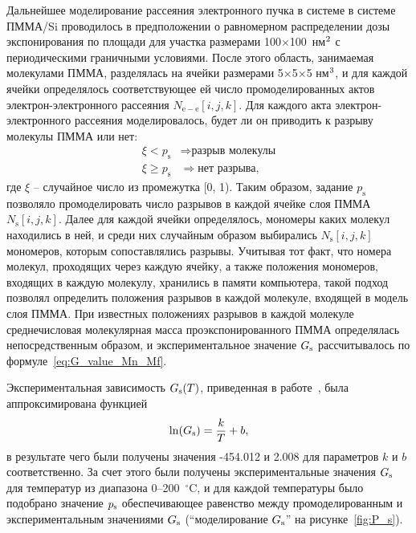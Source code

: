 Дальнейшее моделирование рассеяния электронного пучка в системе в системе ПММА/Si проводилось в предположении о равномерном распределении дозы экспонирования по площади для участка размерами 100$\times$100~нм$^\text{2}$ с периодическими граничными условиями.
После этого область, занимаемая молекулами ПММА, разделялась на ячейки размерами 5$\times$5$\times$5 нм$^\text{3}$, и для каждой ячейки определялось соответствующее ей число промоделированных актов электрон-электронного рассеяния $N_{\mathrm{e-e}}[i, j, k]$.
Для каждого акта электрон-электронного рассеяния моделировалось, будет ли он приводить к разрыву молекулы ПММА или нет:
\begin{equation} \label{eq:MC_9}
	\begin{aligned}
		\xi < p_\mathrm{s} & \Rightarrow \text{разрыв молекулы} \\
		\xi \geq p_\mathrm{s} & \Rightarrow \text{нет разрыва},
	\end{aligned}
\end{equation}
где $\xi$ -- случайное число из промежутка [0, 1).
Таким образом, задание $p_\mathrm{s}$ позволяло промоделировать число разрывов в каждой ячейке слоя ПММА $N_\mathrm{s}[i, j, k]$.
Далее для каждой ячейки определялось, мономеры каких молекул находились в ней, и среди них случайным образом выбирались $N_\mathrm{s}[i, j, k]$ мономеров, которым сопоставлялись разрывы.
Учитывая тот факт, что номера молекул, проходящих через каждую ячейку, а также положения мономеров, входящих в каждую молекулу, хранились в памяти компьютера, такой подход позволял определить положения разрывов в каждой молекуле, входящей в модель слоя ПММА.
При известных положениях разрывов в каждой молекуле среднечисловая молекулярная масса проэкспонированного ПММА определялась непосредственным образом, и экспериментальное значение $G_\mathrm{s}$ рассчитывалось по формуле~\ref{eq:G_value_Mn_Mf}.

Экспериментальная зависимость $G_\mathrm{s}(T)$, приведенная в работе~\cite{Charlesby_1964_Gs}, была аппроксимирована функцией
\begin{equation}
	\ln(G_\mathrm{s}) = \frac{k}{T} + b,
\end{equation}
в результате чего были получены значения -454.012 и 2.008 для параметров $k$ и $b$ соответственно.
За счет этого были получены экспериментальные значения $G_\mathrm{s}$ для температур из диапазона 0--200~$^\circ$C, и для каждой температуры было подобрано значение $p_\mathrm{s}$ обеспечивающее равенство между промоделированным и экспериментальным значениями $G_\mathrm{s}$ (``моделирование $G_\mathrm{s}$'' на рисунке~\ref{fig:P_s}).

